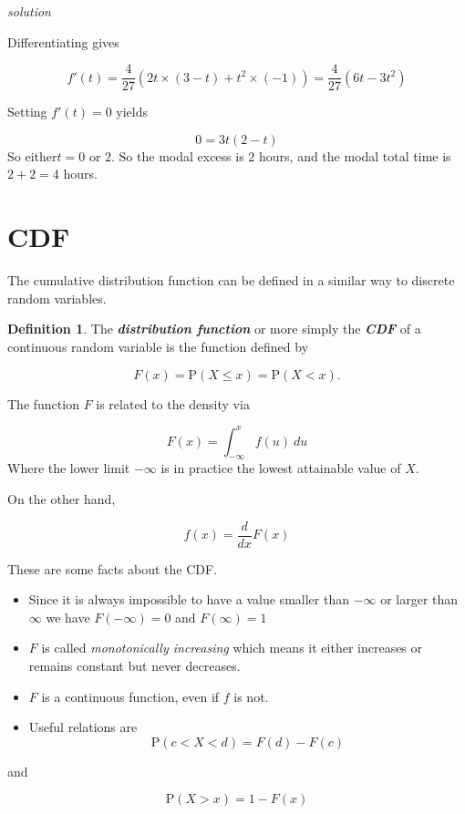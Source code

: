 \documentclass[
]{book}
\theoremstyle{definition}
\newtheorem{definition}{Definition}[chapter]
\theoremstyle{definition}
\theoremstyle{definition}
\theoremstyle{definition}
\theoremstyle{remark}
\begin{document}
\emph{solution}

Differentiating gives

\[f'(t) = \frac{4}{27}(2t \times(3-t) + t^2\times(-1)) = \frac{4}{27}(6t -3t^2)\]

Setting \(f'(t)=0\) yields

\[0 = 3t(2 - t) \]
So either\(t=0\) or \(2\). So the modal excess is \(2\) hours, and the modal total time is \(2+2=4\) hours.

\hypertarget{cdf}{%
\section{CDF}\label{cdf}}

The cumulative distribution function can be defined in a similar way to discrete random variables.

\begin{definition}
The \textbf{\emph{distribution function}} or more simply the \textbf{\emph{CDF}} of a continuous random variable is the function defined by

\[F(x) = \text{P}(X\leq x) = \text{P}(X< x).\]

The function \(F\) is related to the density via

\[F(x) = \int_{-\infty}^{x}f(u) \ du\]
Where the lower limit \(-\infty\) is in practice the lowest attainable value of \(X\).

On the other hand,

\[ f(x) = \frac{d}{dx} F(x)\]
\end{definition}

These are some facts about the CDF.

\begin{itemize}
\item
  Since it is always impossible to have a value smaller than \(-\infty\) or larger than \(\infty\) we have \(F(-\infty)=0\) and \(F(\infty)=1\)
\item
  \(F\) is called \emph{monotonically increasing} which means it either increases or remains constant but never decreases.
\item
  \(F\) is a continuous function, even if \(f\) is not.
\item
  Useful relations are
  \[\text{P}(c<X<d) = F(d) - F(c)\]
\end{itemize}

and

\[ \text{P}(X>x) = 1-F(x)\]
\end{document}
